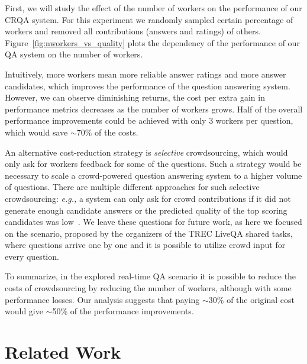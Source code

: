 \documentclass[letterpaper]{article}
\makeatletter
\newcommand{\eg}{\textit{e.g.,}\@\xspace}
\makeatother
\begin{document}
First, we will study the effect of the number of workers on the performance of our CRQA system.
For this experiment we randomly sampled certain percentage of workers and removed all contributions (answers and ratings) of others.
Figure~\ref{fig:nworkers_vs_quality} plots the dependency of the performance of our QA system on the number of workers.

Intuitively, more workers mean more reliable answer ratings and more answer candidates, which improves the performance of the question answering system.
However, we can observe diminishing returns, the cost per extra gain in performance metrics decreases as the number of workers grows.
Half of the overall performance improvements could be achieved with only 3 workers per question, which would save $\sim$70\% of the costs.

An alternative cost-reduction strategy is {\em selective} crowdsourcing, which would only ask for workers feedback for some of the questions.
Such a strategy would be necessary to scale a crowd-powered question answering system to a higher volume of questions.
There are multiple different approaches for such selective crowdsourcing: \eg a system can only ask for crowd contributions if it did not generate enough candidate answers or the predicted quality of the top scoring candidates was low~\cite{carmel2010estimating,he2006query}.
We leave these questions for future work, as here we focused on the scenario, proposed by the organizers of the TREC LiveQA shared tasks, where questions arrive one by one and it is possible to utilize crowd input for every question.

To summarize, in the explored real-time QA scenario it is possible to reduce the costs of crowdsourcing by reducing the number of workers, although with some performance losses.
Our analysis suggests that paying $\sim$30\% of the original cost would give $\sim$50\% of the performance improvements.

\section{Related Work}
\label{sec:related_work}
\end{document}
